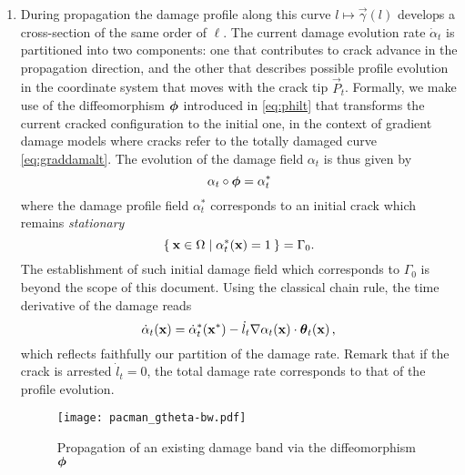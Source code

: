 \begin{hypothesis}
\begin{enumerate}
\item During propagation the damage profile along this curve $l\mapsto\vec{\gamma}(l)$ develops a cross-section of the same order of $\ell$. The current damage evolution rate $\dot{\alpha}_t$ is partitioned into two components: one that contributes to crack advance in the propagation direction, and the other that describes possible profile evolution in the coordinate system that moves with the crack tip $\vec{P}_t$. Formally, we make use of the diffeomorphism $\philt$ introduced in \eqref{eq:philt} that transforms the current cracked configuration to the initial one, in the context of gradient damage models where cracks refer to the totally damaged curve \eqref{eq:graddamalt}. The evolution of the damage field $\alpha_t$ is thus given by
\begin{equation} \label{eq:transportofdamage}
\alpha_t\circ\philt=\alpha_t^*
\end{equation}
where the damage profile field $\alpha_t^*$ corresponds to an initial crack which remains \emph{stationary}
\[
\set{\vec{x}\in\Omega|\alpha_t^*(\vec{x})=1}=\Gamma_0.
\]
The establishment of such initial damage field which corresponds to $\Gamma_0$ is beyond the scope of this document. Using the classical chain rule, the time derivative of the damage reads
\begin{equation} \label{eq:alphadot}
\dot{\alpha}_t(\vec{x})=\dot{\alpha}_t^*(\vec{x}^*)-\dot{l}_t\nabla\alpha_t(\vec{x})\cdot\vtheta_t(\vec{x})\,,
\end{equation}
which reflects faithfully our partition of the damage rate. Remark that if the crack is arrested $\dot{l}_t=0$, the total damage rate corresponds to that of the profile evolution.
\begin{figure}[htbp]
\centering
\texttt{[image: pacman\_gtheta-bw.pdf]}
\caption{Propagation of an existing damage band via the diffeomorphism $\philt$} \label{fig:pacmangtheta}
\end{figure}
\end{enumerate}
\end{hypothesis}

